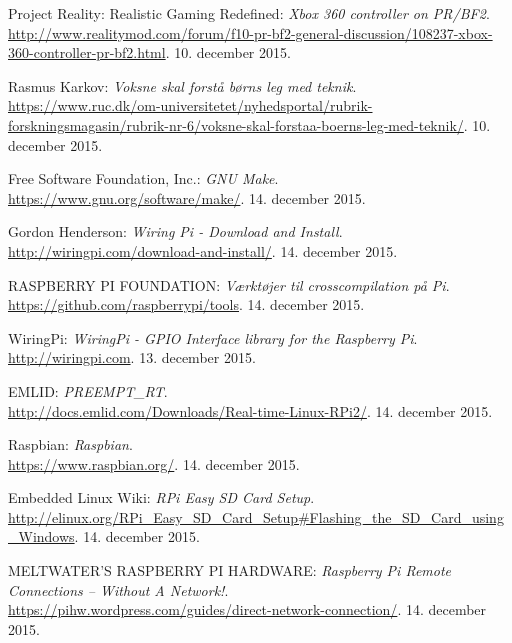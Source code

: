 \begin{thebibliography}{2}
 Project Reality: Realistic Gaming Redefined: \textit{Xbox 360 controller on PR/BF2}. \\
\url{http://www.realitymod.com/forum/f10-pr-bf2-general-discussion/108237-xbox-360-controller-pr-bf2.html}. 10. december 2015.

 Rasmus Karkov: \textit{Voksne skal forstå børns leg med teknik}. \\
\url{https://www.ruc.dk/om-universitetet/nyhedsportal/rubrik-forskningsmagasin/rubrik-nr-6/voksne-skal-forstaa-boerns-leg-med-teknik/}. 10. december 2015.

 Free Software Foundation, Inc.: \textit{GNU Make}. \\
\url{https://www.gnu.org/software/make/}. 14. december 2015.

 Gordon Henderson: \textit{Wiring Pi - Download and Install}. \\
\url{http://wiringpi.com/download-and-install/}. 14. december 2015.

 RASPBERRY PI FOUNDATION: \textit{Værktøjer til crosscompilation på Pi}. \\
\url{https://github.com/raspberrypi/tools}. 14. december 2015.

 WiringPi: \textit{WiringPi - GPIO Interface library for the Raspberry Pi}. \\
\url{http://wiringpi.com}. 13. december 2015.

 EMLID: \textit{PREEMPT\_RT}. \\
\url{http://docs.emlid.com/Downloads/Real-time-Linux-RPi2/}. 14. december 2015.

 Raspbian: \textit{Raspbian}. \\
\url{https://www.raspbian.org/}. 14. december 2015.

 Embedded Linux Wiki: \textit{RPi Easy SD Card Setup}. \\
\url{http://elinux.org/RPi_Easy_SD_Card_Setup#Flashing_the_SD_Card_using_Windows}. 14. december 2015.

 MELTWATER'S RASPBERRY PI HARDWARE: \textit{Raspberry Pi Remote Connections – Without A Network!}. \\
\url{https://pihw.wordpress.com/guides/direct-network-connection/}. 14. december 2015.

\end{thebibliography}
